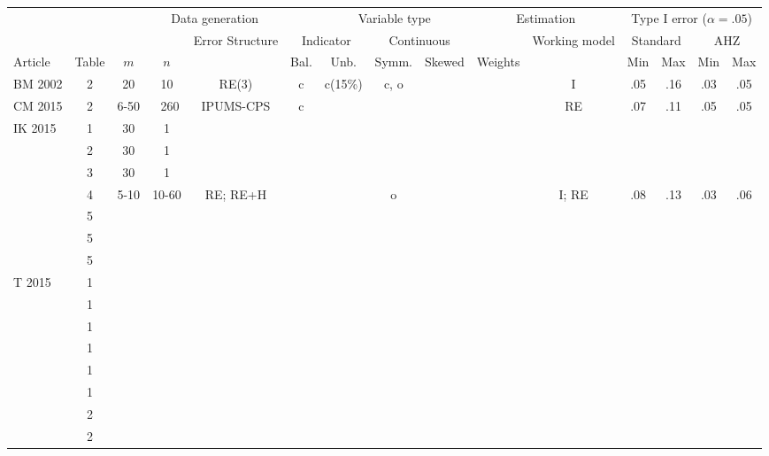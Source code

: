 \begin{tabular}{lc ccc cccc cc cccc} 
\toprule
 & & \multicolumn{4}{c}{Data generation}  & \multicolumn{3}{c}{Variable type} & \multicolumn{2}{c}{Estimation} & \multicolumn{4}{c}{Type I error ($\alpha = .05$)} \\
 & & & & \multirow{2}{2cm}{Error Structure} & \multicolumn{2}{c}{Indicator} & \multicolumn{2}{c}{Continuous} & & \multirow{2}{1.5cm}{Working model} & \multicolumn{2}{c}{Standard} & \multicolumn{2}{c}{AHZ} \\ 
Article & Table & $m$ & $n$ & & Bal. & Unb. & Symm. & Skewed & Weights &  & Min & Max & Min & Max \\ \midrule
BM 2002 & 2 & 20 & 10 & RE(3) & c & c(15\%) & c, o & & & I & .05 & .16 & .03 & .05 \\
CM 2015 & 2 & 6-50 & ~260 & IPUMS-CPS & c & & & & & RE & .07 & .11 & .05 & .05 \\ \midrule
\multirow{7}{1.5cm}{IK 2015} & 1 & 30 & 1 & \\
& 2 & 30 & 1 & \\
& 3 & 30 & 1 & \\
& 4 & 5-10 & 10-60 & RE; RE+H & & & o & & & I; RE & .08 & .13 & .03 & .06 \\
& 5 \\ 
& 5 \\
& 5 \\ \midrule
\multirow{8}{1.5cm}{T 2015} & 1 \\
& 1 \\
& 1 \\
& 1 \\
& 1 \\ 
& 1 \\
& 2 \\
& 2 \\
\bottomrule
\end{tabular}


